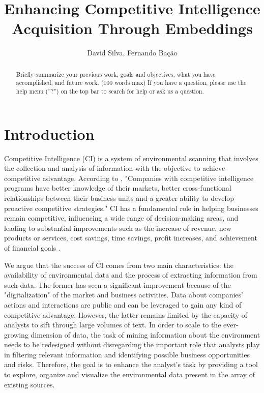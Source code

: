 \documentclass[a4paper]{article}
\title{Enhancing Competitive Intelligence Acquisition Through Embeddings}
\author{David Silva, Fernando Bação}
\date{}
\begin{document}
\maketitle

\begin{abstract}
	Briefly summarize your previous work, goals and objectives, what you have accomplished, and future work. (100 words max) If you have a question, please use the help menu (''?'') on the top bar to search for help or ask us a question.
\end{abstract}

\section*{Introduction}
Competitive Intelligence (CI) is a system of environmental scanning that involves the collection and analysis of information with the objective to achieve competitive advantage. According to \citet{brod1999}, "Companies with competitive intelligence programs have better knowledge of their markets, better cross-functional relationships between their business units and a greater ability to develop proactive competitive strategies." CI has a fundamental role in helping businesses remain competitive, influencing a wide range of decision-making areas, and leading to substantial improvements such as the increase of revenue, new products or services, cost savings, time savings, profit increases, and achievement of financial goals \citep{calof2017}.

We argue that the success of CI comes from two main characteristics: the availability of environmental data and the process of extracting information from such data. The former has seen a significant improvement because of the "digitalization" of the market and business activities. Data about companies' actions and interactions are public and can be leveraged to gain any kind of competitive advantage. However, the latter remains limited by the capacity of analysts to sift through large volumes of text. In order to scale to the ever-growing dimension of data, the task of mining information about the environment needs to be redesigned without disregarding the important role that analysts play in filtering relevant information and identifying possible business opportunities and risks. Therefore, the goal is to enhance the analyst's task by providing a tool to explore, organize and visualize the environmental data present in the array of existing sources.
\end{document}
